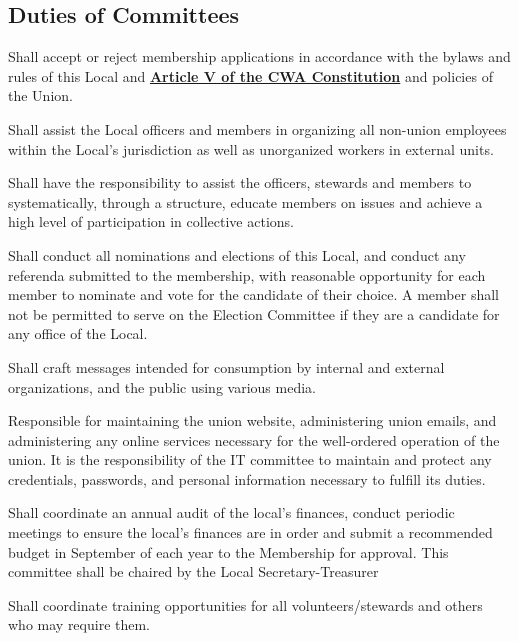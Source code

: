 \documentclass[11pt]{article}
\let\oldhref\href
\renewcommand{\href}[2]{\oldhref{#1}{\bfseries#2}}
\newcommand{\articlesection}[1]{\vspace{.25cm}\subsection{#1}}
\begin{document}
\articlesection{Duties of Committees}\label{duties-of-committees}
\begin{description}[labelwidth=\linewidth, listparindent=0pt]
\item[Membership Committee]
Shall accept or reject membership applications in accordance with the bylaws and rules of this Local and \href{https://cwa-union.org/for-locals/cwa-constitution\#A5}{Article V of the CWA Constitution} and policies of the Union.

\item[Organizing Committee]
Shall assist the Local officers and members in organizing all non-union employees within the Local's jurisdiction as well as unorganized workers in external units.

\item[Mobilization Committee]
Shall have the responsibility to assist the officers, stewards and members to systematically, through a structure, educate members on issues and achieve a high level of participation in collective actions.

\item[Election Committee]
Shall conduct all nominations and elections of this Local, and conduct any referenda submitted to the membership,  with reasonable opportunity for each member to nominate and vote for the candidate of their choice. A member shall not be permitted to serve on the Election Committee if they are a candidate for any office of the Local.

\item[Communications Committee]
Shall craft messages intended for consumption by internal and external organizations, and the public using various media.

\item[IT Committee]
Responsible for maintaining the union website, administering union emails, and administering any online services necessary for the well-ordered operation of the union. It is the responsibility of the IT committee to maintain and protect any credentials, passwords, and personal information necessary to fulfill its duties.

\item[Finance Committee]
Shall coordinate an annual audit of the local’s finances, conduct periodic meetings to ensure the local’s finances are in order and submit a recommended budget in September of each year to the Membership for approval. This committee shall be chaired by the Local Secretary-Treasurer

\item[Education Committee]
Shall coordinate training opportunities for all volunteers/stewards and others who may require them.


\end{description}
\end{document}

